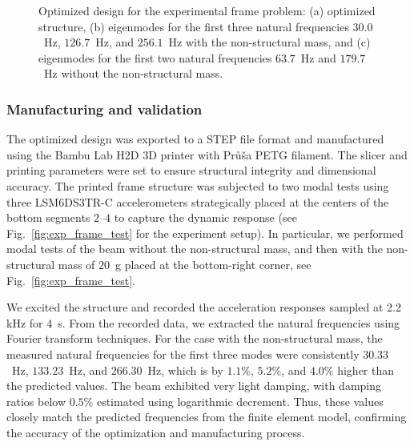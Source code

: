 \documentclass[preprint,3p]{elsarticle}
\numberwithin{equation}{section}
\begin{document}
\begin{figure}[!t]
\begin{subfigure}{0.3\linewidth}
{\begin{tikzpicture}
    \end{tikzpicture}}
    \caption{}
  \end{subfigure}
  \caption{Optimized design for the experimental frame problem: (a) optimized structure, (b) eigenmodes for the first three natural frequencies $30.0$~Hz, $126.7$~Hz, and $256.1$~Hz with the non-structural mass, and (c) eigenmodes for the first two natural frequencies $63.7$~Hz and $179.7$~Hz without the non-structural mass.}
  \label{fig:exp_frame_design}
\end{figure}

\subsubsection{Manufacturing and validation}

The optimized design was exported to a STEP file format and manufactured using the Bambu Lab H2D 3D printer with Pr\r{u}\v{s}a PETG filament. The slicer and printing parameters were set to ensure structural integrity and dimensional accuracy. The printed frame structure was subjected to two modal tests using three LSM6DS3TR-C accelerometers strategically placed at the centers of the bottom segments $2$--$4$ to capture the dynamic response (see Fig.~\ref{fig:exp_frame_test} for the experiment setup). In particular, we performed modal tests of the beam without the non-structural mass, and then with the non-structural mass of $20$~g placed at the bottom-right corner, see Fig.~\ref{fig:exp_frame_test}.

We excited the structure and recorded the acceleration responses sampled at 2.2 kHz for $4$~s. From the recorded data, we extracted the natural frequencies using Fourier transform techniques. For the case with the non-structural mass, the measured natural frequencies for the first three modes were consistently $30.33$~Hz, $133.23$~Hz, and $266.30$~Hz, which is by $1.1\%$, $5.2\%$, and $4.0\%$ higher than the predicted values. The beam exhibited very light damping, with damping ratios below $0.5\%$ estimated using logarithmic decrement. Thus, these values closely match the predicted frequencies from the finite element model, confirming the accuracy of the optimization and manufacturing process.
\end{document}
